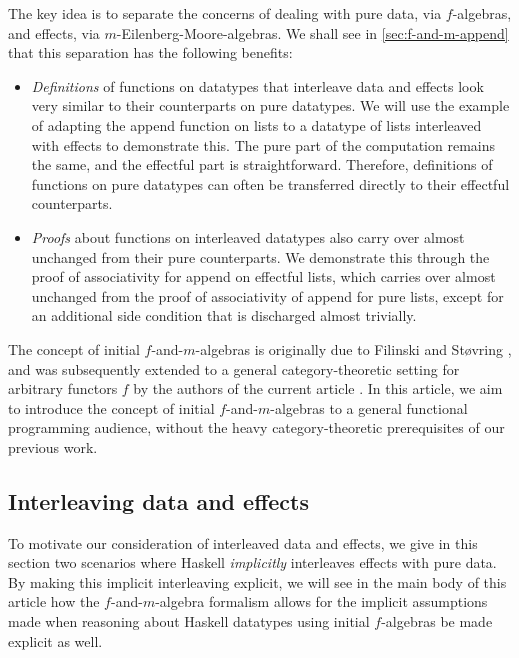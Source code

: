 \documentclass{jfp1}
\begin{document}
The key idea is to separate the concerns of dealing with pure data,
via $f$-algebras, and effects, via $m$-Eilenberg-Moore-algebras. We
shall see in \autoref{sec:f-and-m-append} that this separation has the
following benefits:
\begin{itemize}
\item \emph{Definitions} of functions on datatypes that interleave
  data and effects look very similar to their counterparts on pure
  datatypes. We will use the example of adapting the append function
  on lists to a datatype of lists interleaved with effects to
  demonstrate this. The pure part of the computation remains the same,
  and the effectful part is straightforward. Therefore, definitions of
  functions on pure datatypes can often be transferred directly to
  their effectful counterparts.
\item \emph{Proofs} about functions on interleaved datatypes also
  carry over almost unchanged from their pure counterparts. We
  demonstrate this through the proof of associativity for append on
  effectful lists, which carries over almost unchanged from the proof
  of associativity of append for pure lists, except for an additional
  side condition that is discharged almost trivially.
\end{itemize}


The concept of initial $f$-and-$m$-algebras is originally due to
Filinski and St\o{}vring \cite{filinski07inductive}, and was
subsequently extended to a general category-theoretic setting for
arbitrary functors $f$ by the authors of the current article
\cite{atkey12fibrational}. In this article, we aim to introduce the
concept of initial $f$-and-$m$-algebras to a general functional
programming audience, without the heavy category-theoretic
prerequisites of our previous work.

\subsection{Interleaving data and effects}
\label{sec:motivate-interleaving}

To motivate our consideration of interleaved data and effects, we give
in this section two scenarios where Haskell \emph{implicitly}
interleaves effects with pure data. By making this implicit
interleaving explicit, we will see in the main body of this article
how the $f$-and-$m$-algebra formalism allows for the implicit
assumptions made when reasoning about Haskell datatypes using initial
$f$-algebras be made explicit as well.
\end{document}
